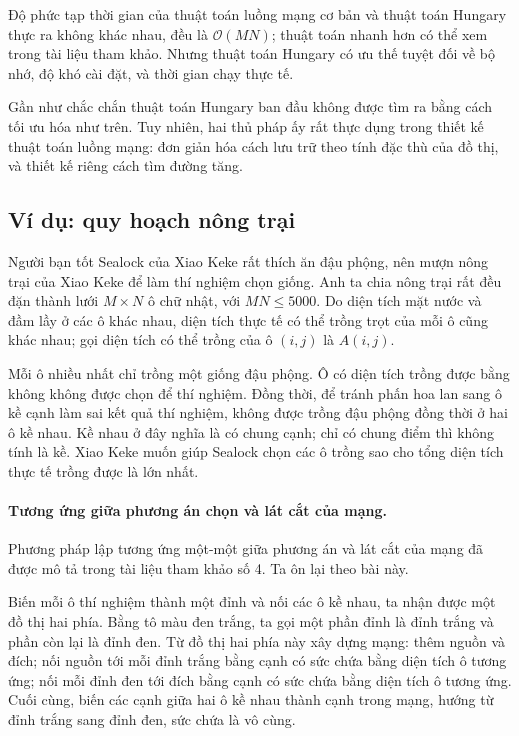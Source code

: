 \documentclass[11pt]{article}
\newcommand{\Oh}{\mathcal{O}}
\begin{document}
Độ phức tạp thời gian của thuật toán luồng mạng cơ bản và thuật toán Hungary
thực ra không khác nhau, đều là \(\Oh(MN)\); thuật toán nhanh hơn có thể xem
trong tài liệu tham khảo. Nhưng thuật toán Hungary có ưu thế tuyệt đối về bộ
nhớ, độ khó cài đặt, và thời gian chạy thực tế.

Gần như chắc chắn thuật toán Hungary ban đầu không được tìm ra bằng cách tối
ưu hóa như trên. Tuy nhiên, hai thủ pháp ấy rất thực dụng trong thiết kế thuật
toán luồng mạng: đơn giản hóa cách lưu trữ theo tính đặc thù của đồ thị, và
thiết kế riêng cách tìm đường tăng.

\subsection{Ví dụ: quy hoạch nông trại}

Người bạn tốt Sealock của Xiao Keke rất thích ăn đậu phộng, nên mượn nông
trại của Xiao Keke để làm thí nghiệm chọn giống. Anh ta chia nông trại rất đều
đặn thành lưới \(M\times N\) ô chữ nhật, với \(MN\le 5000\). Do diện tích mặt
nước và đầm lầy ở các ô khác nhau, diện tích thực tế có thể trồng trọt của
mỗi ô cũng khác nhau; gọi diện tích có thể trồng của ô \((i,j)\) là \(A(i,j)\).

Mỗi ô nhiều nhất chỉ trồng một giống đậu phộng. Ô có diện tích trồng được bằng
không không được chọn để thí nghiệm. Đồng thời, để tránh phấn hoa lan sang ô
kề cạnh làm sai kết quả thí nghiệm, không được trồng đậu phộng đồng thời ở
hai ô kề nhau. Kề nhau ở đây nghĩa là có chung cạnh; chỉ có chung điểm thì
không tính là kề. Xiao Keke muốn giúp Sealock chọn các ô trồng sao cho tổng
diện tích thực tế trồng được là lớn nhất.

\paragraph{Tương ứng giữa phương án chọn và lát cắt của mạng.}
Phương pháp lập tương ứng một-một giữa phương án và lát cắt của mạng đã được
mô tả trong tài liệu tham khảo số 4. Ta ôn lại theo bài này.

Biến mỗi ô thí nghiệm thành một đỉnh và nối các ô kề nhau, ta nhận được một
đồ thị hai phía. Bằng tô màu đen trắng, ta gọi một phần đỉnh là đỉnh trắng và
phần còn lại là đỉnh đen. Từ đồ thị hai phía này xây dựng mạng: thêm nguồn và
đích; nối nguồn tới mỗi đỉnh trắng bằng cạnh có sức chứa bằng diện tích ô
tương ứng; nối mỗi đỉnh đen tới đích bằng cạnh có sức chứa bằng diện tích ô
tương ứng. Cuối cùng, biến các cạnh giữa hai ô kề nhau thành cạnh trong mạng,
hướng từ đỉnh trắng sang đỉnh đen, sức chứa là vô cùng.
\end{document}
